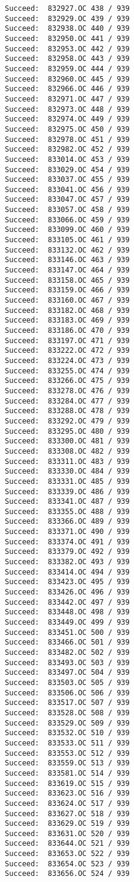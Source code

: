 \documentclass[11pt]{article}
\begin{document}
\begin{verbatim}
Succeed:  832927.OC 438 / 939
Succeed:  832929.OC 439 / 939
Succeed:  832938.OC 440 / 939
Succeed:  832950.OC 441 / 939
Succeed:  832953.OC 442 / 939
Succeed:  832958.OC 443 / 939
Succeed:  832959.OC 444 / 939
Succeed:  832960.OC 445 / 939
Succeed:  832966.OC 446 / 939
Succeed:  832971.OC 447 / 939
Succeed:  832973.OC 448 / 939
Succeed:  832974.OC 449 / 939
Succeed:  832975.OC 450 / 939
Succeed:  832978.OC 451 / 939
Succeed:  832982.OC 452 / 939
Succeed:  833014.OC 453 / 939
Succeed:  833029.OC 454 / 939
Succeed:  833037.OC 455 / 939
Succeed:  833041.OC 456 / 939
Succeed:  833047.OC 457 / 939
Succeed:  833057.OC 458 / 939
Succeed:  833066.OC 459 / 939
Succeed:  833099.OC 460 / 939
Succeed:  833105.OC 461 / 939
Succeed:  833132.OC 462 / 939
Succeed:  833146.OC 463 / 939
Succeed:  833147.OC 464 / 939
Succeed:  833158.OC 465 / 939
Succeed:  833159.OC 466 / 939
Succeed:  833160.OC 467 / 939
Succeed:  833182.OC 468 / 939
Succeed:  833183.OC 469 / 939
Succeed:  833186.OC 470 / 939
Succeed:  833197.OC 471 / 939
Succeed:  833222.OC 472 / 939
Succeed:  833224.OC 473 / 939
Succeed:  833255.OC 474 / 939
Succeed:  833266.OC 475 / 939
Succeed:  833278.OC 476 / 939
Succeed:  833284.OC 477 / 939
Succeed:  833288.OC 478 / 939
Succeed:  833292.OC 479 / 939
Succeed:  833295.OC 480 / 939
Succeed:  833300.OC 481 / 939
Succeed:  833308.OC 482 / 939
Succeed:  833311.OC 483 / 939
Succeed:  833330.OC 484 / 939
Succeed:  833331.OC 485 / 939
Succeed:  833339.OC 486 / 939
Succeed:  833341.OC 487 / 939
Succeed:  833355.OC 488 / 939
Succeed:  833366.OC 489 / 939
Succeed:  833371.OC 490 / 939
Succeed:  833374.OC 491 / 939
Succeed:  833379.OC 492 / 939
Succeed:  833382.OC 493 / 939
Succeed:  833414.OC 494 / 939
Succeed:  833423.OC 495 / 939
Succeed:  833426.OC 496 / 939
Succeed:  833442.OC 497 / 939
Succeed:  833448.OC 498 / 939
Succeed:  833449.OC 499 / 939
Succeed:  833451.OC 500 / 939
Succeed:  833466.OC 501 / 939
Succeed:  833482.OC 502 / 939
Succeed:  833493.OC 503 / 939
Succeed:  833497.OC 504 / 939
Succeed:  833503.OC 505 / 939
Succeed:  833506.OC 506 / 939
Succeed:  833517.OC 507 / 939
Succeed:  833528.OC 508 / 939
Succeed:  833529.OC 509 / 939
Succeed:  833532.OC 510 / 939
Succeed:  833533.OC 511 / 939
Succeed:  833553.OC 512 / 939
Succeed:  833559.OC 513 / 939
Succeed:  833581.OC 514 / 939
Succeed:  833619.OC 515 / 939
Succeed:  833623.OC 516 / 939
Succeed:  833624.OC 517 / 939
Succeed:  833627.OC 518 / 939
Succeed:  833629.OC 519 / 939
Succeed:  833631.OC 520 / 939
Succeed:  833644.OC 521 / 939
Succeed:  833653.OC 522 / 939
Succeed:  833654.OC 523 / 939
Succeed:  833656.OC 524 / 939

\end{verbatim}
\end{document}
